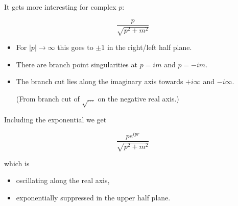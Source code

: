 \documentclass[aspectratio=169]{beamer}
\newcommand{\sqrtpm}{\sqrt{p^2 + m^2}}
\newcommand{\envelope}{\frac{p}{\sqrtpm}}
\newcommand{\integrand}{\frac{p e^{ipr}}{\sqrt{p^2 + m^2}}}
\begin{document}
\begin{frame}
It gets more interesting for complex $p$:

\pause
$$\envelope$$

\begin{itemize}

\pause
\item For $|p| \rightarrow \infty$ this goes to \alert{$\pm 1$} in the right/left half plane.

\pause
\item There are branch point \alert{singularities} at $p = im$ and $p = -im$.

\pause
\item The \alert{branch cut} lies along the imaginary axis towards $+i\infty$ and $-i\infty$.
\pause

(From branch cut of $\sqrt{\ldots}$ on the negative real axis.)
\end{itemize}
\end{frame}




\begin{frame}
Including the exponential we get

\pause
$$\integrand$$

which is

\begin{itemize}
\pause
\item \alert{oscillating} along the real axis,

\pause
\item \alert{exponentially suppressed} in the upper half plane.
\end{itemize}
\end{frame}
\end{document}
